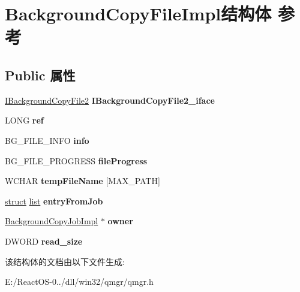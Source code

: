 \hypertarget{struct_background_copy_file_impl}{}\section{Background\+Copy\+File\+Impl结构体 参考}
\label{struct_background_copy_file_impl}
\subsection*{Public 属性}
\begin{DoxyCompactItemize}
\item 
\mbox{\label{struct_background_copy_file_impl_abf890b80bbbe3acd16e92c97d1ca883c}} 
\hyperlink{interface_i_background_copy_file2}{I\+Background\+Copy\+File2} {\bfseries I\+Background\+Copy\+File2\+\_\+iface}
\item 
\mbox{\label{struct_background_copy_file_impl_a0c093e0377fe5ca6012eb99f8cf89c6b}} 
L\+O\+NG {\bfseries ref}
\item 
\mbox{\label{struct_background_copy_file_impl_a345d09357e32ef12e20d295854c145bb}} 
B\+G\+\_\+\+F\+I\+L\+E\+\_\+\+I\+N\+FO {\bfseries info}
\item 
\mbox{\label{struct_background_copy_file_impl_a07cdd3280aec4d592cf189e5338e1bec}} 
B\+G\+\_\+\+F\+I\+L\+E\+\_\+\+P\+R\+O\+G\+R\+E\+SS {\bfseries file\+Progress}
\item 
\mbox{\label{struct_background_copy_file_impl_a941dea6a3391bbbf0ce205bd04897cfe}} 
W\+C\+H\+AR {\bfseries temp\+File\+Name} \mbox{[}M\+A\+X\+\_\+\+P\+A\+TH\mbox{]}
\item 
\mbox{\label{struct_background_copy_file_impl_a95eaf07cfce0d8d28d13a08d7b665142}} 
\hyperlink{interfacestruct}{struct} \hyperlink{classlist}{list} {\bfseries entry\+From\+Job}
\item 
\mbox{\label{struct_background_copy_file_impl_a3cdae8b148cb38af075e5c0e761134f9}} 
\hyperlink{struct_background_copy_job_impl}{Background\+Copy\+Job\+Impl} $\ast$ {\bfseries owner}
\item 
\mbox{\label{struct_background_copy_file_impl_a1c7cd0acddf2d5ce0ba011e1438fd893}} 
D\+W\+O\+RD {\bfseries read\+\_\+size}
\end{DoxyCompactItemize}


该结构体的文档由以下文件生成\+:\begin{DoxyCompactItemize}
\item 
E\+:/\+React\+O\+S-\/0../dll/win32/qmgr/qmgr.\+h\end{DoxyCompactItemize}

